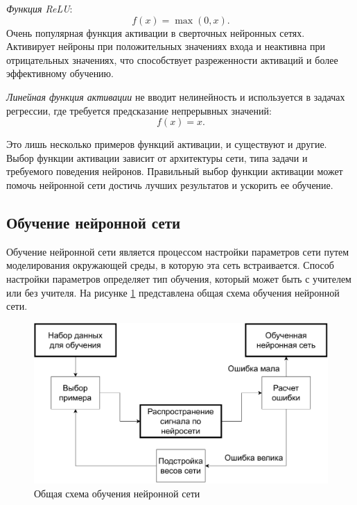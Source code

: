 \textit{Функция ReLU}:
\begin{equation}
f(x) = \max(0, x).
\end{equation}
Очень популярная функция активации в сверточных нейронных сетях. Активирует нейроны при положительных значениях входа и неактивна при отрицательных значениях, что способствует разреженности активаций и более эффективному обучению.

\textit{Линейная функция активации} не вводит нелинейность и используется в задачах регрессии, где требуется предсказание непрерывных значений:
\begin{equation}
   f(x) = x.
\end{equation}

Это лишь несколько примеров функций активации, и существуют и другие. Выбор функции активации зависит от архитектуры сети, типа задачи и требуемого поведения нейронов. Правильный выбор функции активации может помочь нейронной сети достичь лучших результатов и ускорить ее обучение.

\subsection{Обучение нейронной сети}

Обучение нейронной сети является процессом настройки параметров сети путем моделирования окружающей среды, в которую эта сеть встраивается. Способ настройки параметров определяет тип обучения, который может быть с учителем или без учителя. На рисунке \ref{fig:learning} представлена общая схема обучения нейронной сети. 

\begin{figure}[h!btp]
	\centering
	\includegraphics[scale = 0.8]{inc/analysis/learning.pdf}
	\caption{Общая схема обучения нейронной сети}
	\label{fig:learning}	
\end{figure}

